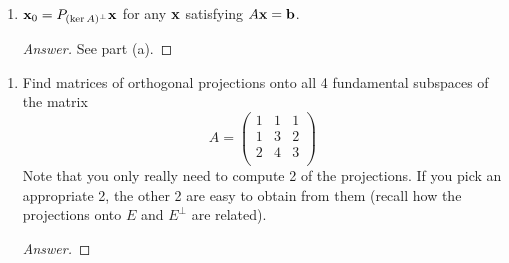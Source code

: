 \documentclass[../psets.tex]{subfiles}
\begin{document}
\begin{enumerate}[label={\textbf{4.\arabic*.}}]
\begin{enumerate}
\begin{proof}[Answer]
            \begin{equation*}
                \norm{\x}^2 = \norm{\x_0}^2+\norm{\x_h}^2 \geq \norm{\x_0}
            \end{equation*}
            so $\x_0$ is the unique minimal norm solution because any other solution with a nontrivial $\x_h$ necessarily has a greater norm.
        \end{proof}
        \item $\mathbf{x}_0=P_{(\ker A)^\perp}\mathbf{x}$ for any $\mathbf{x}$ satisfying $A\mathbf{x}=\mathbf{b}$.
        \begin{proof}[Answer]
            See part (a).
        \end{proof}
    \end{enumerate}
\end{enumerate}

\begin{enumerate}[label={\textbf{5.\arabic*.}}]
    \item Find matrices of orthogonal projections onto all 4 fundamental subspaces of the matrix
    \begin{equation*}
        A =
        \begin{pmatrix}
            1 & 1 & 1\\
            1 & 3 & 2\\
            2 & 4 & 3\\
        \end{pmatrix}
    \end{equation*}
    Note that you only really need to compute 2 of the projections. If you pick an appropriate 2, the other 2 are easy to obtain from them (recall how the projections onto $E$ and $E^\perp$ are related).
    \begin{proof}[Answer]



\end{proof}
\end{enumerate}
\end{document}
